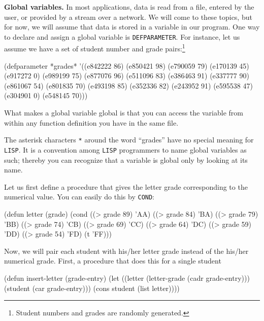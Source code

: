\documentclass[a4paper,11pt]{article}
\begin{document}
\begin{uenum}

\item {\bf Global variables.} In most applications, data is read from a file, entered by the user, or provided by a stream over a network. We will come to these topics, but for now, we will assume that data is stored in a  variable in our program. One way to declare and assign a global variable is \Verb+DEFPARAMETER+. For instance, let us assume we have a set of student number and grade pairs:\footnote{Student numbers and grades are randomly generated.}

\begin{lispcode}
(defparameter *grades* 
  '((e842222 86) (e850421 98) (e790059 79) (e170139 45)
    (e917272 0)  (e989199 75) (e877076 96) (e511096 83)
    (e386463 91) (e337777 90) (e861067 54) (e801835 70)
    (e493198 85) (e352336 82) (e243952 91) (e595538 47)
    (e304901 0)  (e548145 70)))
\end{lispcode}

\begin{uenumi}
\item What makes a global variable global is that you can access the variable from within any function definition you have in the same file. 
\item The asterisk characters \Verb+*+ around the word ``grades'' have no special meaning for \Verb+LISP+. It is a convention among \Verb+LISP+ programmers to name global variables as such; thereby you can recognize that a variable is global only by looking at its name.
\end{uenumi}


\item Let us first define a procedure that gives the letter grade corresponding to the numerical value. You can easily do this by \Verb+COND+: 

\begin{lispcode}
(defun letter (grade)
  (cond ((> grade 89) 'AA)
        ((> grade 84) 'BA)
        ((> grade 79) 'BB)
        ((> grade 74) 'CB)
        ((> grade 69) 'CC)
        ((> grade 64) 'DC)
        ((> grade 59) 'DD)
        ((> grade 54) 'FD)
        (t 'FF)))
\end{lispcode}

Now, we will pair each student with his/her letter grade instead of the his/her numerical grade. First, a procedure that does this for a single student 

\begin{lispcode}
(defun insert-letter (grade-entry)
  (let ((letter (letter-grade (cadr grade-entry)))
        (student (car grade-entry)))
    (cons student (list letter))))
\end{lispcode}


\end{uenum}
\end{document}
